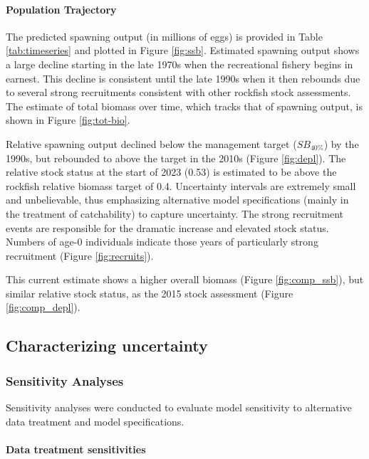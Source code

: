 \documentclass[11pt,
  english,
  letterpaper,
]{article}
\begin{document}
\hypertarget{population-trajectory}{%
\paragraph{Population Trajectory}\label{population-trajectory}}

The predicted spawning output (in millions of eggs) is provided in Table \ref{tab:timeseries} and plotted in Figure \ref{fig:ssb}. Estimated spawning output shows a large decline starting in the late 1970s when the recreational fishery begins in earnest. This decline is consistent until the late 1990s when it then rebounds due to several strong recruitments consistent with other rockfish stock assessments. The estimate of total biomass over time, which tracks that of spawning output, is shown in Figure \ref{fig:tot-bio}.

Relative spawning output declined below the management target (\(SB_{40\%}\)) by the 1990s, but rebounded to above the target in the 2010s (Figure \ref{fig:depl}). The relative stock status at the start of 2023 (0.53) is estimated to be above the rockfish relative biomass target of 0.4. Uncertainty intervals are extremely small and unbelievable, thus emphasizing alternative model specifications (mainly in the treatment of catchability) to capture uncertainty. The strong recruitment events are responsible for the dramatic increase and elevated stock status. Numbers of age-0 individuals indicate those years of particularly strong recruitment (Figure \ref{fig:recruits}).

This current estimate shows a higher overall biomass (Figure \ref{fig:comp_ssb}), but similar relative stock status, as the 2015 stock assessment (Figure \ref{fig:comp_depl}).

\hypertarget{characterizing-uncertainty}{%
\subsection{Characterizing uncertainty}\label{characterizing-uncertainty}}

\hypertarget{sensitivity-analyses}{%
\subsubsection{Sensitivity Analyses}\label{sensitivity-analyses}}

Sensitivity analyses were conducted to evaluate model sensitivity to alternative data treatment and model specifications.

\hypertarget{data-treatment-sensitivities}{%
\paragraph{Data treatment sensitivities}\label{data-treatment-sensitivities}}
\end{document}
